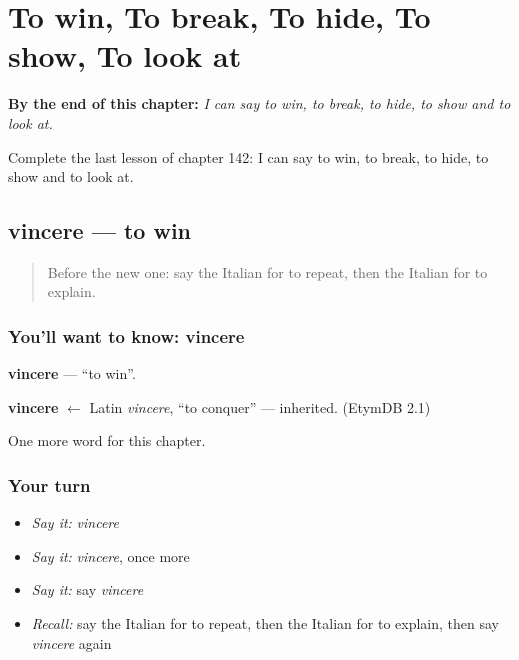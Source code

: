 
\chapter{To win, To break, To hide, To show, To look at}
\label{ch:it-to-win-to-break-to-hide-to-show-to-look-at}

\begin{chapteropening}
\textbf{By the end of this chapter:} \emph{I can say to win, to break, to hide, to show and to look at.}

Complete the last lesson of chapter 142: I can say to win, to break, to hide, to show and to look at.
\end{chapteropening}

\section[vincere]{vincere — to win}

\label{lesson:IT-C142-vincere}



\begin{quote}
Before the new one: say the Italian for to repeat, then the Italian for to explain.
\end{quote}

\subsection*{You'll want to know: vincere}
\textbf{vincere} — \textquotedblleft{}to win\textquotedblright{}.

\begin{cousinweb}
\textbf{vincere} $\leftarrow$ Latin \emph{vincere}, \textquotedblleft{}to conquer\textquotedblright{} — inherited. (EtymDB 2.1)
\end{cousinweb}

\begin{grammarlens}[title={What you've built}]
One more word for this chapter.
\end{grammarlens}

\subsection*{Your turn}
\begin{itemize}
\raggedright
  \item \emph{Say it:} \emph{vincere}
  \item \emph{Say it:} \emph{vincere}, once more
  \item \emph{Say it:} say \emph{vincere}
  \item \emph{Recall:} say the Italian for to repeat, then the Italian for to explain, then say \emph{vincere} again
\end{itemize}

